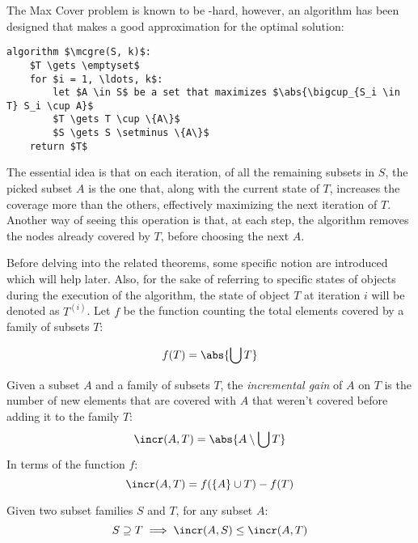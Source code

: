 The Max Cover problem is known to be \np-hard, however, an algorithm has been designed that makes a good approximation for the optimal solution:

\noindent\begin{minipage}{\linewidth}
    \begin{lstlisting}[caption = {The Greedy algorithm to solve the densest subgraph problem}, label = {lst:mcp-greedy}]
algorithm $\mcgre(S, k)$:
    $T \gets \emptyset$
    for $i = 1, \ldots, k$:
        let $A \in S$ be a set that maximizes $\abs{\bigcup_{S_i \in T} S_i \cup A}$
        $T \gets T \cup \{A\}$
        $S \gets S \setminus \{A\}$
    return $T$
    \end{lstlisting}
\end{minipage}

The essential idea is that on each iteration, of all the remaining subsets in $S$, the picked subset $A$ is the one that, along with the current state of $T$, increases the coverage more than the others, effectively maximizing the next iteration of $T$. Another way of seeing this operation is that, at each step, the algorithm removes the nodes already covered by $T$, before choosing the next $A$.

Before delving into the related theorems, some specific notion are introduced which will help later. Also, for the sake of referring to specific states of objects during the execution of the algorithm, the state of object $T$ at iteration $i$ will be denoted as $T^{(i)}$. Let $f$ be the function counting the total elements covered by a family of subsets $T$:

\[
    f(T) = \abs{\bigcup T}
\]

\begin{definition}\label{def:incremental-gain}
    Given a subset $A$ and a family of subsets $T$, the \emph{incremental gain} of $A$ on $T$ is the number of new elements that are covered with $A$ that weren't covered before adding it to the family $T$:
    \[
        \incr(A, T) = \abs{A \setminus \bigcup T}
    \]
    In terms of the function $f$:
    \begin{equation}\label{eq:mcp-dsa}
        \incr(A, T) = f(\{A\} \cup T) - f(T)
    \end{equation}
\end{definition}

\begin{proposition}\label{prop:mcp-dimret}
    Given two subset families $S$ and $T$, for any subset $A$:
    \[
        S \supseteq T \implies \incr(A, S) \leq \incr(A, T)
    \]
\end{proposition}

